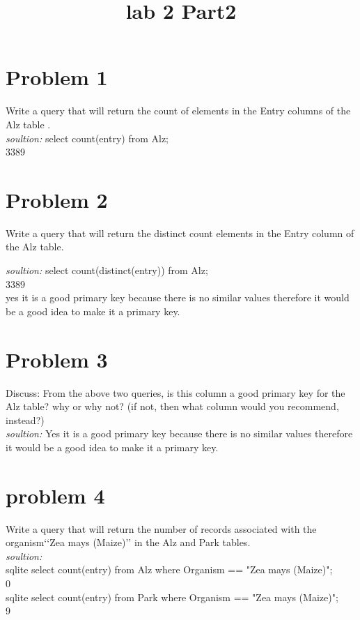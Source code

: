 \documentclass{article}
\begin{document}
\title{lab 2 Part2 }
\maketitle

\section*{Problem 1}
Write a query that will return the count of elements in the Entry columns of the Alz
table .\\
\textit{soultion:}
select count(entry) from Alz;\\
3389

\section*{Problem 2}
Write a query that will return the distinct count elements in the Entry column
of the Alz table.


\textit{soultion:}
select count(distinct(entry)) from Alz;\\
3389\\

yes it is a good primary key because there is no similar values therefore it would be a good idea to make it a primary key. 

\section*{Problem 3}
Discuss: From the above two queries, is this column a good primary key for the Alz table? why or why not? (if not, then what column would you recommend, instead?)\\
\textit{soultion:}
Yes it is a good primary key because there is no similar values therefore it would be a good idea to make it a primary key. 
\section*{problem 4}
Write a query that will return the number of records associated with the organism‘‘Zea mays (Maize)’’ in the Alz and Park tables.\\
\textit{soultion:}\\
sqlite select count(entry) from Alz where Organism == "Zea mays (Maize)";\\
0\\
sqlite select count(entry) from Park where Organism == "Zea mays (Maize)";\\
9
\end{document}
